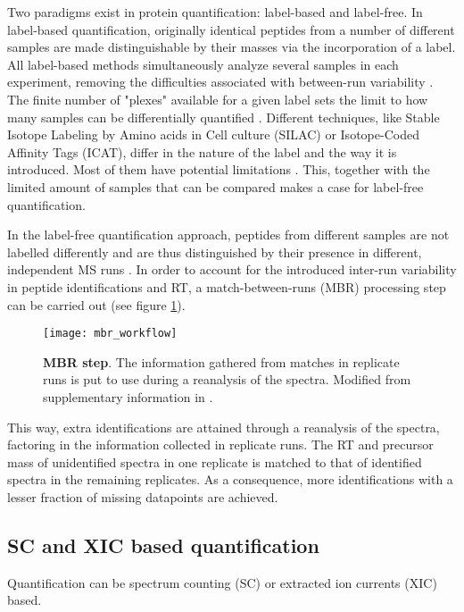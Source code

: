 Two paradigms exist in protein quantification: label-based and label-free. In label-based quantification, originally identical peptides from a number of different samples are made distinguishable by their masses via the incorporation of a label. All label-based methods simultaneously analyze several samples in each experiment, removing the difficulties associated with between-run variability \cite{Barsnes2008}. The finite number of "plexes" available for a given label sets the limit to how many samples can be differentially quantified \cite{Cox2014}. Different techniques, like Stable Isotope Labeling by Amino acids in Cell culture (SILAC) or Isotope-Coded Affinity Tags (ICAT), differ in the nature of the label and the way it is introduced. Most of them have potential limitations \cite{Patel2009}. This, together with the limited amount of samples that can be compared makes a case for label-free quantification.

In the label-free quantification approach, peptides from different samples are not labelled differently and are thus distinguished by their presence in different, independent \ac{MS} runs \cite{Barsnes2008}. In order to account for the introduced inter-run variability in peptide identifications and \ac{RT}, a match-between-runs (MBR) processing step can be carried out (see figure \ref{figure:moff_mbr}). 


\begin{figure}[!h]
\centering
\texttt{[image: mbr\_workflow]}
\caption[Match Between Runs module]{\textbf{\ac{MBR} step}. The information gathered from matches in replicate runs is put to use during a reanalysis of the spectra. Modified from supplementary information in \cite{Argentini2016}.}
\label{figure:moff_mbr}
\end{figure}

This way, extra identifications are attained through a reanalysis of the spectra, factoring in the information collected in replicate runs. The RT and precursor mass of unidentified spectra in one replicate is matched to that of identified spectra in the remaining replicates. As a consequence, more identifications with a lesser fraction of missing datapoints are achieved.


\subsection{SC and XIC based quantification}
\label{subsec:scvsxic}


Quantification can be spectrum counting (\ac{SC}) or extracted ion currents (\ac{XIC}) based.


